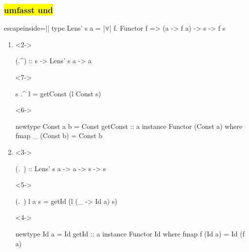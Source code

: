 \documentclass{beamer}
\newcommand{\fa}{$\forall$}
\begin{document}
\begin{frame}[fragile]
  \frametitle{
    \colorbox{yellow}{
       umfasst
        und
       
    }
  }

\begin{haskellcode*}{escapeinside=||}
type Lens' s a = |\fa| f. Functor f => (a -> f a) -> s -> f s
\end{haskellcode*}

  \begin{enumerate}
    \item
    \begin{visibleenv}<2->
\begin{haskellcode}
(.^) :: s -> Lens' s a -> a
\end{haskellcode}
    \end{visibleenv}
    \vspace{-0.8em}
    \begin{visibleenv}<7->
\begin{haskellcode}
s .^ l = getConst (l Const s)
\end{haskellcode}
    \end{visibleenv}

    \begin{visibleenv}<6->
\begin{haskellcode}
newtype Const a b = Const { getConst :: a }
instance Functor (Const a) where
  fmap _ (Const b) = Const b
\end{haskellcode}
    \end{visibleenv}
    \vspace{1em}

    \item
    \begin{visibleenv}<3->
\begin{haskellcode}
(.~) :: Lens' s a -> a -> s -> s
\end{haskellcode}
    \end{visibleenv}
    \vspace{-0.8em}
    \begin{visibleenv}<5->
\begin{haskellcode}
(.~) l a s = getId (l (\_ -> Id a) s)
\end{haskellcode}
    \end{visibleenv}

    \begin{visibleenv}<4->
\begin{haskellcode}
newtype Id a = Id { getId :: a }
instance Functor Id where
  fmap f (Id a) = Id (f a)
\end{haskellcode}
    \end{visibleenv}
  \end{enumerate}
\end{frame}
\end{document}
